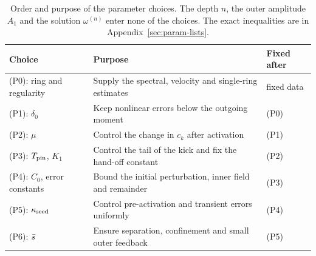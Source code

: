 \begin{table}[H]
\centering
\small
\begin{tabular}{@{}p{}p{}p{}@{}}
\hline
Choice & Purpose & Fixed after \\
\hline
(P0): ring and regularity & Supply the spectral, velocity and single-ring estimates & fixed data \\
(P1): $\delta_0$ & Keep nonlinear errors below the outgoing moment & (P0) \\
(P2): $\mu$ & Control the change in $c_k$ after activation & (P1) \\
(P3): $T_{\mathrm{pin}}$, $K_1$ & Control the tail of the kick and fix the hand-off constant & (P2) \\
(P4): $C_0$, error constants & Bound the initial perturbation, inner field and remainder & (P3) \\
(P5): $\kappa_{\mathrm{seed}}$ & Control pre-activation and transient errors uniformly & (P4) \\
(P6): $\bar s$ & Ensure separation, confinement and small outer feedback & (P5) \\
\hline
\end{tabular}
\caption{Order and purpose of the parameter choices. The depth $n$, the outer
amplitude $A_1$ and the solution $\omega^{(n)}$ enter none of the choices.
The exact inequalities are in Appendix~\ref{sec:param-lists}.}
\label{tab:param}
\end{table}
